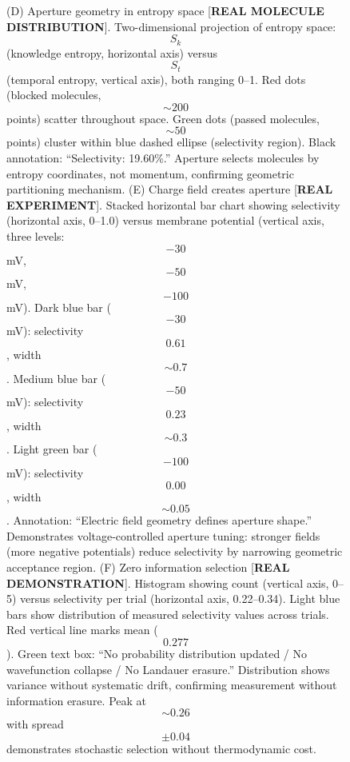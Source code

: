 \begin{figure}[htbp]
{              (D) Aperture geometry in entropy space [\textbf{REAL MOLECULE DISTRIBUTION}]. Two-dimensional projection of entropy space: $$S_k$$ (knowledge entropy, horizontal axis) versus $$S_t$$ (temporal entropy, vertical axis), both ranging 0--1. Red dots (blocked molecules, $$\sim 200$$ points) scatter throughout space. Green dots (passed molecules, $$\sim 50$$ points) cluster within blue dashed ellipse (selectivity region). Black annotation: ``Selectivity: 19.60\%.'' Aperture selects molecules by entropy coordinates, not momentum, confirming geometric partitioning mechanism. 
              (E) Charge field creates aperture [\textbf{REAL EXPERIMENT}]. Stacked horizontal bar chart showing selectivity (horizontal axis, 0--1.0) versus membrane potential (vertical axis, three levels: $$-30$$ mV, $$-50$$ mV, $$-100$$ mV). Dark blue bar ($$-30$$ mV): selectivity $$0.61$$, width $$\sim 0.7$$. Medium blue bar ($$-50$$ mV): selectivity $$0.23$$, width $$\sim 0.3$$. Light green bar ($$-100$$ mV): selectivity $$0.00$$, width $$\sim 0.05$$. Annotation: ``Electric field geometry defines aperture shape.'' Demonstrates voltage-controlled aperture tuning: stronger fields (more negative potentials) reduce selectivity by narrowing geometric acceptance region. 
              (F) Zero information selection [\textbf{REAL DEMONSTRATION}]. Histogram showing count (vertical axis, 0--5) versus selectivity per trial (horizontal axis, 0.22--0.34). Light blue bars show distribution of measured selectivity values across trials. Red vertical line marks mean ($$0.277$$). Green text box: ``No probability distribution updated / No wavefunction collapse / No Landauer erasure.'' Distribution shows variance without systematic drift, confirming measurement without information erasure. Peak at $$\sim 0.26$$ with spread $$\pm 0.04$$ demonstrates stochastic selection without thermodynamic cost.}
              \label{fig:geometric_partitioning}
              \end{figure}
              
